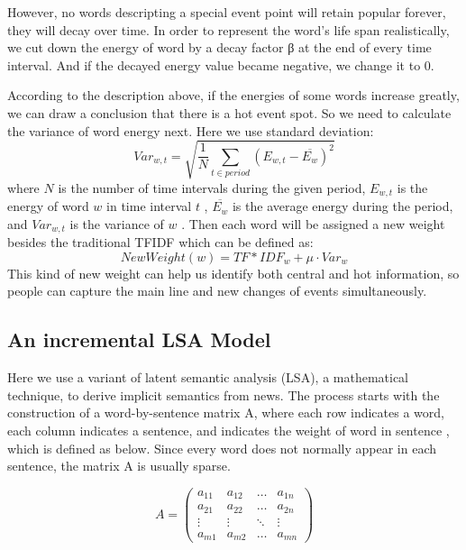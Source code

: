 \documentclass[runningheads,a4paper]{llncs}
\begin{document}
However, no words descripting a special event point will retain popular forever, they will decay over time. In order to represent the word's life span realistically, we cut down the energy of word by a decay factor β at the end of every time interval. And if the decayed energy value became negative, we change it to 0.

According to the description above, if the energies of some words increase greatly, we can draw a conclusion that there is a hot event spot. So we need to calculate the variance of word energy next. Here we use standard deviation:
\begin{equation}
Var_{w,t} = \sqrt{ \frac{1}{N} \sum_{t \in period}(E_{w,t}- \overline{E_{w}})^2}
\end{equation}
where $N$ is the number of time intervals during the given period, $E_{w,t}$  is the energy of word $w$  in time interval $t$ , $\overline{E_{w}}$  is the average energy during the period, and $Var_{w,t}$  is the variance of $w$ .
Then each word will be assigned a new weight besides the traditional TFIDF which can be defined as:
 \begin{equation}
NewWeight(w)=TF*IDF_{w} + \mu \cdot Var_{w}
\end{equation}
This kind of new weight can help us identify both central and hot information, so people can capture the main line and new changes of events simultaneously.

\subsection{An incremental LSA Model}
\label{lsasection}
Here we use a variant of latent semantic analysis (LSA), a mathematical technique, to derive implicit semantics from news. The process starts with the construction of a word-by-sentence matrix A, where each row indicates a word, each column indicates a sentence, and   indicates the weight of word   in sentence , which is defined as below. Since every word does not normally appear in each sentence, the matrix A is usually sparse.

\begin{displaymath}
A = 
\left( \begin{array}{cccc}
a_{11} & a_{12} & \ldots & a_{1n} \\
a_{21} & a_{22} & \ldots & a_{2n} \\
\vdots & \vdots & \ddots & \vdots \\
a_{m1} & a_{m2} & \ldots & a_{mn}
\end{array} \right)
\end{displaymath}
\end{document}
